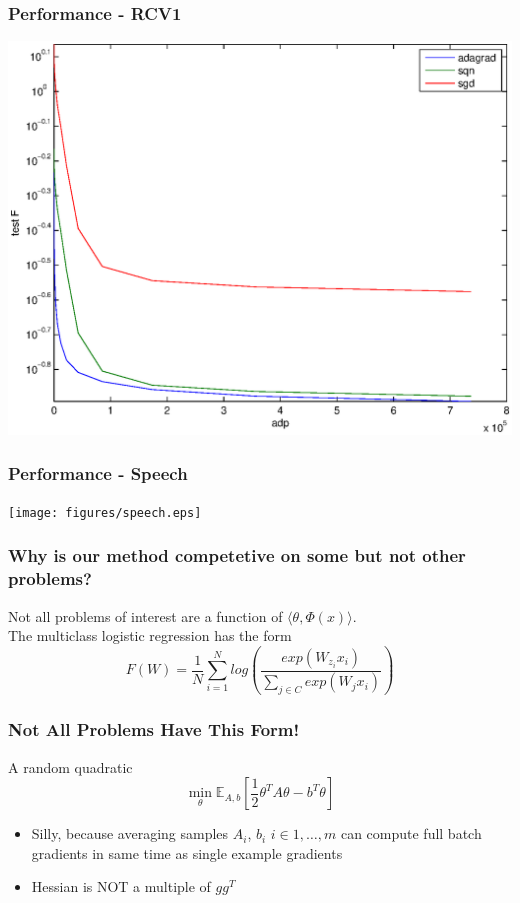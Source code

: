 \documentclass{beamer}
\begin{document}
\begin{frame}
	\frametitle{Performance - RCV1}
	\begin{center}
	\includegraphics[scale=0.4]{figures/rcv1.eps}
	\end{center}
\end{frame}

\begin{frame}
	\frametitle{Performance - Speech}
	\begin{center}
	\texttt{[image: figures/speech.eps]}
	\end{center}
\end{frame}

\begin{frame}
	\frametitle{Why is our method competetive on some but not other problems?}
	Not all problems of interest are a function of $\langle \theta, \Phi(x)\rangle$.\\
	The multiclass logistic regression has the form
	\[
		F(W) = \frac{1}{N} \sum_{i=1}^N log \left( \frac{exp(W_{z_i} x_i)}{\sum_{j \in C} exp(W_j x_i)} \right)
	\]
\end{frame}

\begin{frame}
	\frametitle{Not All Problems Have This Form!}
	   A random quadratic
	   \[
	   		\min_{\theta}\mathbb{E}_{A,b}[\frac{1}{2}\theta^T A \theta - b^T \theta]
	   \]
	   \begin{itemize}
	   	\item Silly, because averaging samples $A_i$, $b_i$ $i \in {1,\ldots,m}$ can compute full batch gradients in same time as single example gradients
	   	\item Hessian is NOT a multiple of $g g^T$ 
	   \end{itemize}
\end{frame}
\end{document}
